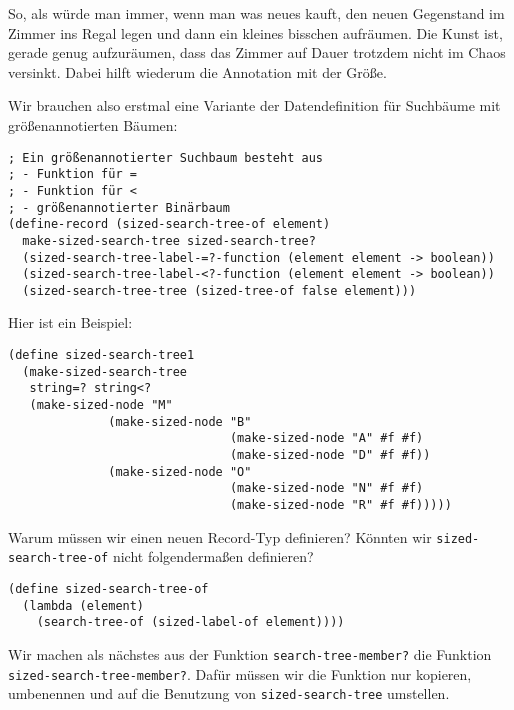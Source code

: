 So, als würde man immer, wenn man was neues kauft, den neuen
Gegenstand im Zimmer ins Regal legen und dann ein kleines bisschen
aufräumen.  Die Kunst ist, gerade genug aufzuräumen, dass das Zimmer
auf Dauer trotzdem nicht im Chaos versinkt.  Dabei hilft wiederum die
Annotation mit der Größe.

Wir brauchen also erstmal eine Variante der Datendefinition für
Suchbäume mit größenannotierten Bäumen:
%
\begin{lstlisting}
; Ein größenannotierter Suchbaum besteht aus
; - Funktion für =
; - Funktion für <
; - größenannotierter Binärbaum
(define-record (sized-search-tree-of element)
  make-sized-search-tree sized-search-tree?
  (sized-search-tree-label-=?-function (element element -> boolean))
  (sized-search-tree-label-<?-function (element element -> boolean))
  (sized-search-tree-tree (sized-tree-of false element)))
\end{lstlisting}
%
Hier ist ein Beispiel:
%
\begin{lstlisting}
(define sized-search-tree1
  (make-sized-search-tree
   string=? string<?
   (make-sized-node "M"
              (make-sized-node "B"
                               (make-sized-node "A" #f #f)
                               (make-sized-node "D" #f #f))
              (make-sized-node "O"
                               (make-sized-node "N" #f #f)
                               (make-sized-node "R" #f #f)))))
\end{lstlisting}
% 
\begin{aufgabeinline}
  Warum müssen wir einen neuen Record-Typ definieren?  Könnten wir
  \lstinline{sized-search-tree-of} nicht folgendermaßen definieren?
\begin{lstlisting}
(define sized-search-tree-of
  (lambda (element)
    (search-tree-of (sized-label-of element))))
\end{lstlisting}
\end{aufgabeinline}
%
Wir machen als nächstes aus der Funktion
\lstinline{search-tree-member?} die Funktion
\lstinline{sized-search-tree-member?}.  Dafür müssen wir die Funktion
nur kopieren, umbenennen und auf die Benutzung von
\lstinline{sized-search-tree} umstellen.\label{func:sized-search-tree-member}
%
